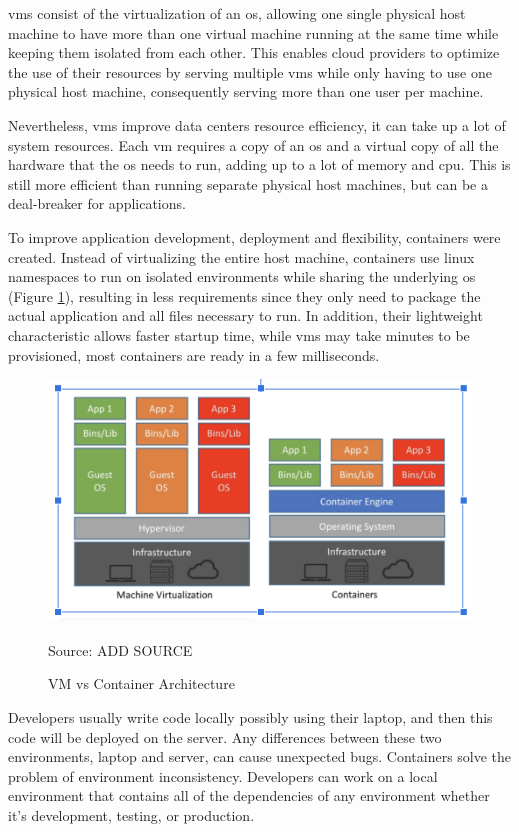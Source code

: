 \gls{vm}s consist of the virtualization of an \gls{os}, allowing one single physical host machine to have more than one virtual machine running at the same time while keeping them isolated from each other. This enables cloud providers to optimize the use of their resources by serving multiple \gls{vm}s while only having to use one physical host machine, consequently serving more than one user per machine.

Nevertheless, \gls{vm}s improve data centers resource efficiency, it can take up a lot of system resources. Each \gls{vm} requires a copy of an \gls{os} and a virtual copy of all the hardware that the \gls{os} needs to run, adding up to a lot of memory and \gls{cpu}. This is still more efficient than running separate physical host machines, but can be a deal-breaker for applications.

To improve application development, deployment and flexibility, containers were created. Instead of virtualizing the entire host machine, containers use linux namespaces to run on isolated environments while sharing the underlying \gls{os} (Figure \ref{figure:vm_vs_container}), resulting in less requirements since they only need to package the actual application and all files necessary to run. In addition, their lightweight characteristic allows faster startup time, while \gls{vm}s may take minutes to be provisioned, most containers are ready in a few milliseconds.

\begin{figure}[ht]
    \centering
    \includegraphics[width=\linewidth]{figures/vm_vs_container.png}
    \caption{VM vs Container Architecture}
    {Source: ADD SOURCE}
    \label{figure:vm_vs_container}
\end{figure}

Developers usually write code locally possibly using their laptop, and then this code will be deployed on the server. Any differences between these two environments, laptop and server, can cause unexpected bugs. Containers solve the problem of environment inconsistency. Developers can work on a local environment that contains all of the dependencies of any environment whether it’s development, testing, or production.


